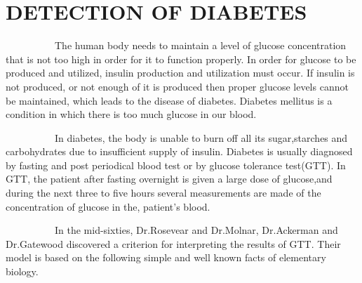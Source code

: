  
\pagebreak

\section{DETECTION OF DIABETES}

\par ~~~~~~~~~~The human body needs to maintain a level of glucose concentration that is not too high in order for it to function properly. In order for glucose to be produced and utilized, insulin production and utilization must occur. If insulin is not produced, or not enough of it is produced then proper glucose levels cannot be maintained, which leads to the disease of diabetes. Diabetes mellitus is a condition in which there is too much glucose in our blood.

\par ~~~~~~~~~~In diabetes, the body is unable to burn off all its sugar,starches and carbohydrates due to insufficient supply of insulin. Diabetes is usually diagnosed by fasting and post periodical blood test or by glucose tolerance test(GTT). In GTT, the patient after fasting overnight is given a large dose of glucose,and during the next three to five hours several measurements are made of the concentration of glucose in the, patient's blood.

\par  ~~~~~~~~~~In the mid-sixties, Dr.Rosevear and Dr.Molnar, Dr.Ackerman and Dr.Gatewood discovered a criterion for interpreting the results of GTT. Their model is based on the following simple and well known facts of elementary biology.

